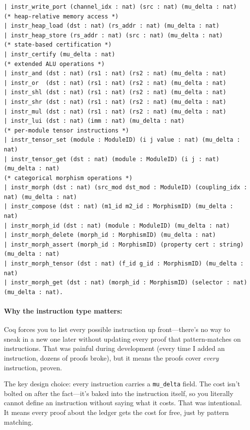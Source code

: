 \begin{lstlisting}
| instr_write_port (channel_idx : nat) (src : nat) (mu_delta : nat)
(* heap-relative memory access *)
| instr_heap_load (dst : nat) (rs_addr : nat) (mu_delta : nat)
| instr_heap_store (rs_addr : nat) (src : nat) (mu_delta : nat)
(* state-based certification *)
| instr_certify (mu_delta : nat)
(* extended ALU operations *)
| instr_and (dst : nat) (rs1 : nat) (rs2 : nat) (mu_delta : nat)
| instr_or  (dst : nat) (rs1 : nat) (rs2 : nat) (mu_delta : nat)
| instr_shl (dst : nat) (rs1 : nat) (rs2 : nat) (mu_delta : nat)
| instr_shr (dst : nat) (rs1 : nat) (rs2 : nat) (mu_delta : nat)
| instr_mul (dst : nat) (rs1 : nat) (rs2 : nat) (mu_delta : nat)
| instr_lui (dst : nat) (imm : nat) (mu_delta : nat)
(* per-module tensor instructions *)
| instr_tensor_set (module : ModuleID) (i j value : nat) (mu_delta : nat)
| instr_tensor_get (dst : nat) (module : ModuleID) (i j : nat) (mu_delta : nat)
(* categorical morphism operations *)
| instr_morph (dst : nat) (src_mod dst_mod : ModuleID) (coupling_idx : nat) (mu_delta : nat)
| instr_compose (dst : nat) (m1_id m2_id : MorphismID) (mu_delta : nat)
| instr_morph_id (dst : nat) (module : ModuleID) (mu_delta : nat)
| instr_morph_delete (morph_id : MorphismID) (mu_delta : nat)
| instr_morph_assert (morph_id : MorphismID) (property cert : string) (mu_delta : nat)
| instr_morph_tensor (dst : nat) (f_id g_id : MorphismID) (mu_delta : nat)
| instr_morph_get (dst : nat) (morph_id : MorphismID) (selector : nat) (mu_delta : nat).
\end{lstlisting}

\paragraph{Why the instruction type matters:} Coq forces you to list every possible instruction up front---there's no way to sneak in a new one later without updating every proof that pattern-matches on instructions. That was painful during development (every time I added an instruction, dozens of proofs broke), but it means the proofs cover \emph{every} instruction, proven.

The key design choice: every instruction carries a \texttt{mu\_delta} field. The cost isn't bolted on after the fact---it's baked into the instruction itself, so you literally cannot define an instruction without saying what it costs. That was intentional. It means every proof about the ledger gets the cost for free, just by pattern matching.


